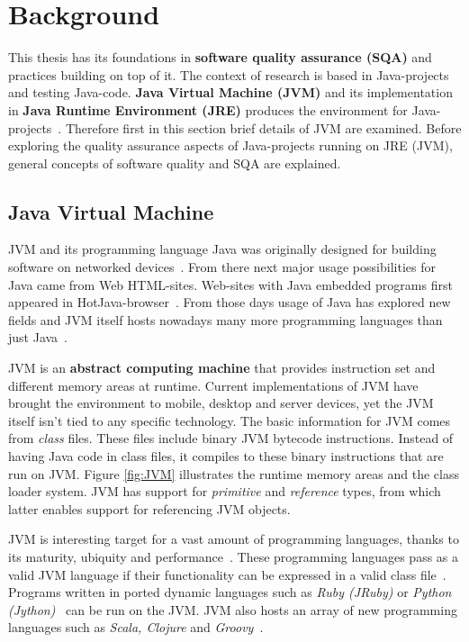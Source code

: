 \chapter{Background}
\label{chapter:background} 

This thesis has its foundations in \textbf{software quality assurance (SQA)} and practices building on top of it. The context of research
is based in Java-projects and testing Java-code. \textbf{Java Virtual Machine (JVM)} and its implementation in \textbf{Java Runtime Environment (JRE)}
produces the environment for Java-projects~\cite{wiki:jvm}. Therefore first in this section brief details of JVM are examined.
Before exploring the quality assurance aspects of Java-projects running on JRE (JVM), general concepts of software quality and SQA are explained.

\section{Java Virtual Machine} %
    JVM and its programming language Java was originally designed for building software on networked devices~\cite{lindholm2015java}. From there
    next major usage possibilities for Java came from Web HTML-sites. Web-sites with Java embedded programs first appeared in HotJava-browser~\cite{lindholm2015java}.
    From those days usage of Java has explored new fields and JVM itself hosts nowadays many more programming languages than
    just Java~\cite{wiki:jvm}.

    JVM is an \textbf{abstract computing machine} that provides instruction set and different memory areas at runtime.
    Current implementations of JVM have brought the environment to mobile, desktop and server devices, yet the JVM itself
    isn't tied to any specific technology. The basic information for JVM comes from \textit{class} files. These files include
    binary JVM bytecode instructions. Instead of having Java code in class files, it compiles to these binary instructions
    that are run on JVM. Figure \ref{fig:JVM} illustrates the runtime memory areas and the class loader system.
    JVM has support for \textit{primitive} and \textit{reference} types, from which latter enables support for referencing JVM objects. ~\cite{lindholm2015java}

    JVM is interesting target for a vast amount of programming languages, thanks to its maturity, ubiquity and performance~\cite{sarimbekov2013characteristics}.
    These programming languages pass as a valid JVM language if their functionality can be expressed in a valid class file~\cite{wiki:jvm}.
    Programs written in ported dynamic languages such as \textit{Ruby (JRuby)} or \textit{Python (Jython)}~\cite{sarimbekov2013characteristics} can be run on the JVM.
    JVM also hosts an array of new programming languages such as \textit{Scala, Clojure} and \textit{Groovy}~\cite{wiki:jvm}.

